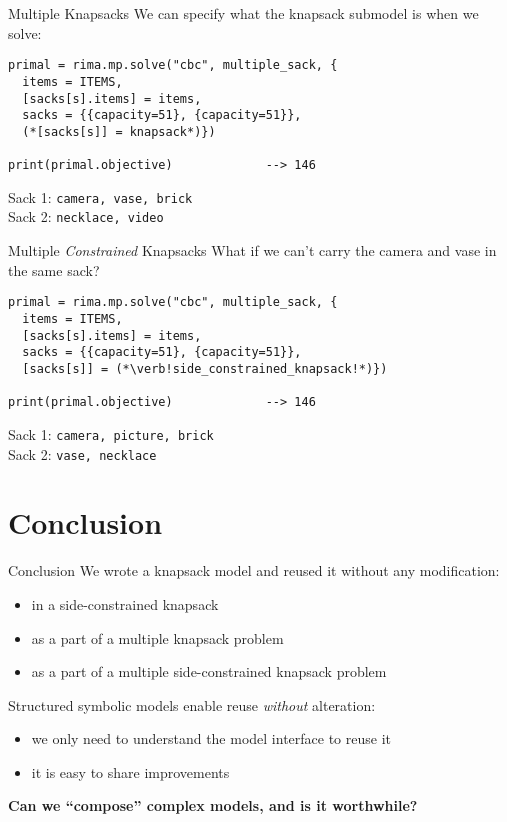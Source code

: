 \documentclass[smaller]{beamer}
\begin{document}
\begin{frame}[fragile]{Multiple Knapsacks}
  We can specify what the knapsack submodel is when we solve:

  \begin{lstlisting}
primal = rima.mp.solve("cbc", multiple_sack, {
  items = ITEMS,
  [sacks[s].items] = items,
  sacks = {{capacity=51}, {capacity=51}},
  (*[sacks[s]] = knapsack*)})

print(primal.objective)             --> 146
  \end{lstlisting}
  Sack 1: \lstinline!camera, vase, brick!\\
  Sack 2: \lstinline!necklace, video!
\end{frame}


\begin{frame}[fragile]{Multiple \emph{Constrained} Knapsacks}
  What if we can't carry the camera and vase in the same sack?

  \begin{lstlisting}
primal = rima.mp.solve("cbc", multiple_sack, {
  items = ITEMS,
  [sacks[s].items] = items,
  sacks = {{capacity=51}, {capacity=51}},
  [sacks[s]] = (*\verb!side_constrained_knapsack!*)})

print(primal.objective)             --> 146
  \end{lstlisting}
  Sack 1: \lstinline!camera, picture, brick!\\
  Sack 2: \lstinline!vase, necklace!
\end{frame}


\section{Conclusion}

\begin{frame}{Conclusion}
  We wrote a knapsack model and reused it without any modification:
  \begin{itemize}
    \item in a side-constrained knapsack
    \item as a part of a multiple knapsack problem
    \item as a part of a multiple side-constrained knapsack problem
  \end{itemize}

  Structured symbolic models enable reuse \emph{without} alteration:
  \begin{itemize}
    \item we only need to understand the model interface to reuse it
    \item it is easy to share improvements
  \end{itemize}

  {\bf Can we ``compose'' complex models, and is it worthwhile?}
\end{frame}


\end{document}

